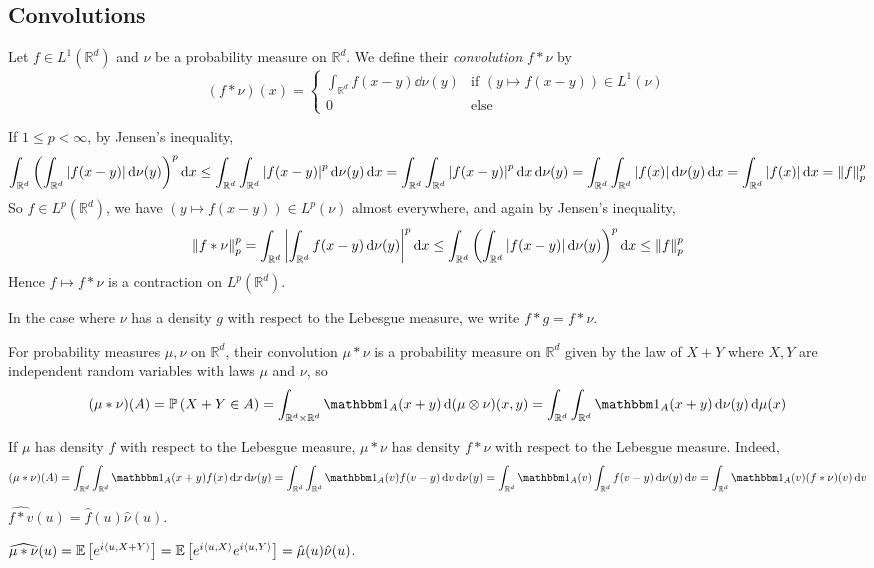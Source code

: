 \subsection{Convolutions}
\begin{definition}
	Let \( f \in L^1(\mathbb R^d) \) and \( \nu \) be a probability measure on \( \mathbb R^d \).
	We define their \emph{convolution} \( f \ast \nu \) by
	\[ (f \ast \nu)(x) = \begin{cases}
		\int_{\mathbb R^d} f(x-y) \dd{\nu(y)} & \text{if } (y \mapsto f(x-y)) \in L^1(\nu) \\
		0 & \text{else}
	\end{cases} \]
\end{definition}
\begin{remark}
	If \( 1 \leq p < \infty \), by Jensen's inequality,
	\[ \int_{\mathbb R^d} \qty( \int_{\mathbb R^d} \abs{f(x-y)} \dd{\nu(y)} )^p \dd{x} \leq \int_{\mathbb R^d} \int_{\mathbb R^d} \abs{f(x-y)}^p \dd{\nu(y)} \dd{x} = \int_{\mathbb R^d} \int_{\mathbb R^d} \abs{f(x-y)}^p \dd{x} \dd{\nu(y)} = \int_{\mathbb R^d} \int_{\mathbb R^d} \abs{f(x)} \dd{\nu(y)} \dd{x} = \int_{\mathbb R^d} \abs{f(x)} \dd{x} = \norm{f}_p^p \]
	So \( f \in L^p(\mathbb R^d) \), we have \( (y \mapsto f(x-y)) \in L^p(\nu) \) almost everywhere, and again by Jensen's inequality,
	\[ \norm{f \ast \nu}_p^p = \int_{\mathbb R^d} \abs{ \int_{\mathbb R^d} f(x-y)\dd{\nu(y)} }^p \dd{x} \leq \int_{\mathbb R^d} \qty( \int_{\mathbb R^d} \abs{f(x-y)} \dd{\nu(y)} )^p \dd{x} \leq \norm{f}_p^p \]
	Hence \( f \mapsto f \ast \nu \) is a contraction on \( L^p(\mathbb R^d) \).
\end{remark}
In the case where \( \nu \) has a density \( g \) with respect to the Lebesgue measure, we write \( f \ast g = f \ast \nu \).
\begin{definition}
	For probability measures \( \mu, \nu \) on \( \mathbb R^d \), their convolution \( \mu \ast \nu \) is a probability measure on \( \mathbb R^d \) given by the law of \( X + Y \) where \( X, Y \) are independent random variables with laws \( \mu \) and \( \nu \), so
	\[ (\mu \ast \nu)(A) = \prob{X+Y \in A} = \int_{\mathbb R^d \times \mathbb R^d} \mathbbm 1_A(x+y) \dd{(\mu \otimes \nu)(x, y)} = \int_{\mathbb R^d} \int_{\mathbb R^d} \mathbbm 1_A(x+y) \dd{\nu(y)} \dd{\mu(x)} \]
\end{definition}
If \( \mu \) has density \( f \) with respect to the Lebesgue measure, \( \mu \ast \nu \) has density \( f \ast \nu \) with respect to the Lebesgue measure.
Indeed,
\[ (\mu \ast \nu)(A) = \int_{\mathbb R^d} \int_{\mathbb R^d} \mathbbm 1_A(x+y) f(x) \dd{x} \dd{\nu(y)} = \int_{\mathbb R^d} \int_{\mathbb R^d} \mathbbm 1_A(v) f(v-y) \dd{v} \dd{\nu(y)} = \int_{\mathbb R^d} \mathbbm 1_A(v) \int_{\mathbb R^d}f(v-y) \dd{\nu(y)} \dd{v} = \int_{\mathbb R^d} \mathbbm 1_A(v) (f \ast \nu)(v) \dd{v} \]
\begin{proposition}
	\( \widehat{f \ast v}(u) = \hat f(u) \hat \nu(u) \).
\end{proposition}
\begin{proposition}
	\( \widehat{\mu \ast \nu}(u) = \mathbb{E}\left[{e^{i\left\langle{u,X+Y}\right\rangle}}\right] = \mathbb{E}\left[{e^{i\left\langle{u,X}\right\rangle}e^{i\left\langle{u,Y}\right\rangle}}\right] = \hat \mu(u) \hat \nu(u) \).
\end{proposition}

